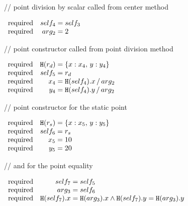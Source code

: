 \begin{flushright}
// point division by scalar called from center method
\end{flushright}\vspace{-0.5\baselineskip}
$\begin{array}{rr@{\;=\;}l}
\mathrm{required} & self_4 & self_3\\
\mathrm{required} & arg_2 & 2
\end{array}$\vspace{-0.5\baselineskip}
\begin{flushright}
// point constructor called from point division method
\end{flushright}\vspace{-0.5\baselineskip}
$\begin{array}{rr@{\;=\;}l}
\mathrm{required} & \Deref(r_{d}) & \{x:x_4,\,y:y_4\}\\
\mathrm{required} & self_5 & r_{d}\\
\mathrm{required} & x_4 & \Deref(self_4).x\,/\,arg_2\\
\mathrm{required} & y_4 & \Deref(self_4).y\,/\,arg_2
\end{array}$\vspace{-0.5\baselineskip}
\begin{flushright}
// point constructor for the static point
\end{flushright}\vspace{-0.5\baselineskip}
$\begin{array}{rr@{\;=\;}l}
\mathrm{required} & \Deref(r_{s}) & \{x:x_5,\,y:y_5\}\\
\mathrm{required} & self_6 & r_{s}\\
\mathrm{required} & x_5 & 10\\
\mathrm{required} & y_5 & 20
\end{array}$\vspace{-0.5\baselineskip}
\begin{flushright}
// and for the point equality
\end{flushright}\vspace{-0.5\baselineskip}
$\begin{array}{rr@{\;=\;}l}
\mathrm{required} & self_7 & self_5\\
\mathrm{required} & arg_3 & self_6\\
\mathrm{required} & \Deref(self_7).x & \Deref(arg_3).x \wedge \Deref(self_7).y = \Deref(arg_3).y
\end{array}$\\

